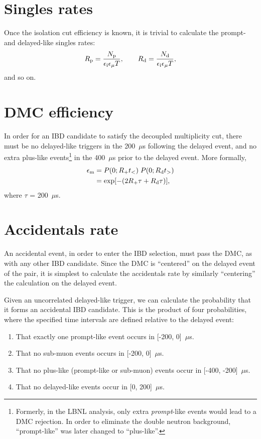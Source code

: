 \documentclass[../thesis.tex]{subfiles}
\begin{document}
\section{Singles rates}
\label{sec:singratescalc}

Once the isolation cut efficiency is known, it is trivial to calculate the prompt- and delayed-like singles rates:
\begin{equation}
  R_\mathrm{p} = \frac{N_\mathrm{p}}{\epsilon_\mathrm{i} \epsilon_\mathrm{\mu} T},\qquad
  R_\mathrm{d} = \frac{N_\mathrm{d}}{\epsilon_\mathrm{i} \epsilon_\mathrm{\mu} T},
\end{equation}
and so on.

\section{DMC efficiency}
\label{sec:dmceffcalc}

\def\edmc{\ensuremath{\epsilon_\mathrm{m}}}

In order for an IBD candidate to satisfy the decoupled multiplicity cut, there must be no delayed-like triggers in the 200~$\mu$s following the delayed event, and no extra plus-like events\footnote{Formerly, in the LBNL analysis, only extra \emph{prompt}-like events would lead to a DMC rejection. In order to eliminate the double neutron background, ``prompt-like'' was later changed to ``plus-like''.} in the 400~$\mu$s prior to the delayed event. More formally,
\begin{align}
  \edmc &= P(0; \Rplu t_<)\;P(0; \Rdel t_>) \nonumber \\
        &= \exp [-(2\Rplu\tau + \Rdel\tau)],
\end{align}
where $\tau$ = 200~$\mu$s.

\section{Accidentals rate}
\label{sec:accratecalc}

An accidental event, in order to enter the IBD selection, must pass the DMC, as with any other IBD candidate. Since the DMC is ``centered'' on the delayed event of the pair, it is simplest to calculate the accidentals rate by similarly ``centering'' the calculation on the delayed event.

Given an uncorrelated delayed-like trigger, we can calculate the probability that it forms an accidental IBD candidate. This is the product of four probabilities, where the specified time intervals are defined relative to the delayed event:

\begin{enumerate}
\item That exactly one prompt-like event occurs in [-200, 0]~$\mu$s.
\item That no sub-muon events occurs in [-200, 0]~$\mu$s.
\item That no plus-like (prompt-like or sub-muon) events occur in [-400, -200]~$\mu$s.
\item That no delayed-like events occur in [0, 200]~$\mu$s.
\end{enumerate}
\end{document}
